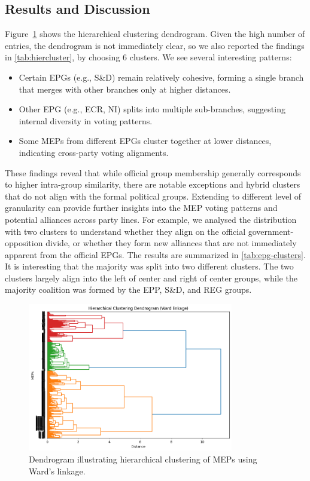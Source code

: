 \documentclass{article}
\begin{document}
\subsection{Results and Discussion}

Figure~\ref{fig:dendrogram} shows the hierarchical clustering dendrogram. Given the high number of entries, the dendrogram
is not immediately clear, so we also reported the findings in \autoref{tab:hiercluster}, by choosing 6 clusters. We see several interesting patterns:
\begin{itemize}
    \item Certain EPGs (e.g., S\&D) remain relatively cohesive, forming a single branch that merges with other branches only at higher distances.
    \item Other EPG (e.g., ECR, NI) splits into multiple sub-branches, suggesting internal diversity in voting patterns.
    \item Some MEPs from different EPGs cluster together at lower distances, indicating cross-party voting alignments.
\end{itemize}
These findings reveal that while official group membership generally corresponds to higher intra-group similarity, there are notable exceptions and hybrid clusters that do not align with the formal political groups.
Extending to different level of granularity can provide further insights into the MEP voting patterns and potential alliances across party lines.
For example, we analysed the distribution with two clusters to understand whether they align on the official government-opposition divide, or whether they form new alliances that are not immediately apparent from the official EPGs.
The results are summarized in \autoref{tab:epg-clusters}. It is interesting that the majority was split into two different clusters. The two clusters largely align into the left of center and right of center groups, while the majority coalition was formed by the EPP, S\&D, and REG groups. 

\begin{figure}[ht]
    \centering
    \includegraphics[width=0.8\textwidth]{dendrogram.png}
    \caption{Dendrogram illustrating hierarchical clustering of MEPs using Ward's linkage.}
    \label{fig:dendrogram}
\end{figure}
\end{document}
